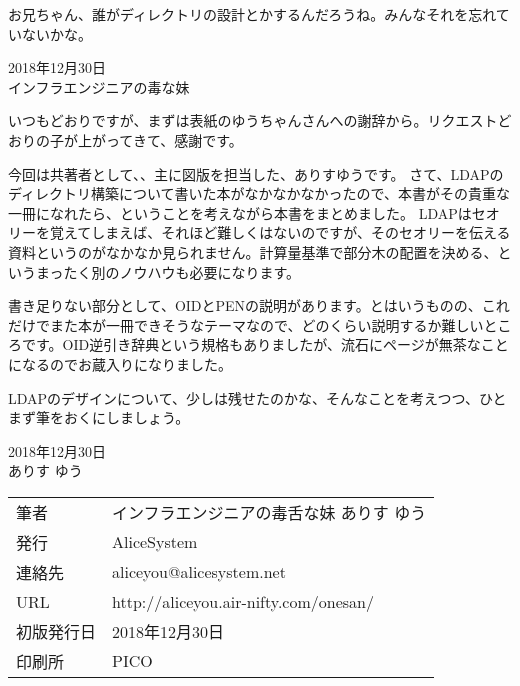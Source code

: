 お兄ちゃん、誰がディレクトリの設計とかするんだろうね。みんなそれを忘れていないかな。

\begin{flushright}
2018年12月30日 \\
インフラエンジニアの毒な妹 \\
\end{flushright}

いつもどおりですが、まずは表紙のゆうちゃんさんへの謝辞から。リクエストどおりの子が上がってきて、感謝です。

今回は共著者として、、主に図版を担当した、ありすゆうです。
さて、LDAPのディレクトリ構築について書いた本がなかなかなかったので、本書がその貴重な一冊になれたら、ということを考えながら本書をまとめました。
LDAPはセオリーを覚えてしまえば、それほど難しくはないのですが、そのセオリーを伝える資料というのがなかなか見られません。計算量基準で部分木の配置を決める、というまったく別のノウハウも必要になります。

書き足りない部分として、OIDとPENの説明があります。とはいうものの、これだけでまた本が一冊できそうなテーマなので、どのくらい説明するか難しいところです。OID逆引き辞典という規格もありましたが、流石にページが無茶なことになるのでお蔵入りになりました。

LDAPのデザインについて、少しは残せたのかな、そんなことを考えつつ、ひとまず筆をおくにしましょう。

\begin{flushright}
2018年12月30日 \\
ありす ゆう
\end{flushright}




\mbox{}
\newpage
\clearpage



\vspace*{\fill}
\begin{tabular}{ll} \toprule
筆者 & インフラエンジニアの毒舌な妹 ありす ゆう\\
発行 & AliceSystem \\
連絡先 & aliceyou@alicesystem.net \\
URL & http://aliceyou.air-nifty.com/onesan/ \\
初版発行日 & 2018年12月30日 \\
印刷所 & PICO  \\ \bottomrule
\end{tabular}